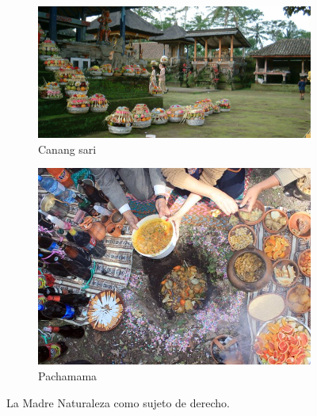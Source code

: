 \documentclass[a4paper,10pt]{book}
\begin{document}
\begin{figure}[ht!]
    \centering
    \begin{subfigure}[b]{0.45\textwidth}
    \centering
    \includegraphics[width=\linewidth]{static/bali-offerings}
    \caption{Canang sari}
    \label{}
    \end{subfigure}
    \begin{subfigure}[b]{0.33\textwidth}
    \centering
    \includegraphics[width=\linewidth]{static/pachamama}
    \caption{Pachamama}
    \label{}
    \end{subfigure}
    \caption{La Madre Naturaleza como sujeto de derecho.}
    \label{fig:mito}
\end{figure}
\end{document}
